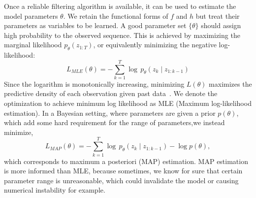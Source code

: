 \documentclass{article}
\begin{document}
Once a reliable filtering algorithm is available, it can be used to estimate the model parameters $\theta$. We retain the functional forms of $f$ and $h$ but treat their parameters as variables to be learned. A good parameter set $\{\theta\}$ should assign high probability to the observed sequence. This is achieved by maximizing the marginal likelihood $p_\theta(z_{1:T})$, or equivalently minimizing the negative log-likelihood:
\begin{equation}
    L_{MLE}(\theta) = -\sum_{k=1}^{T} \log \, p_\theta(z_k \mid z_{1:k-1})
\end{equation}
Since the logarithm is monotonically increasing, minimizing $L(\theta)$ maximizes the predictive density of each observation given past data~\cite{Särkkä2013BayesianFilteringAndSmoothing}. We denote the optimization to achieve minimum log likelihood as MLE (Maximum log-likelihood estimation). In a Bayesian setting, where parameters are given a prior $p(\theta)$, which add some hard requirement for the range of parameters,we instead minimize,
\begin{equation}
    L_{MAP}(\theta) = -\sum_{k=1}^{T} \log \, p_\theta(z_k \mid z_{1:k-1}) - \log p(\theta),
\end{equation}
which corresponds to maximum a posteriori (MAP) estimation. MAP estimation is more informed than MLE, because sometimes, we know for sure that certain parameter range is unreasonable, which could invalidate the model or causing numerical instability for example.












\end{document}
